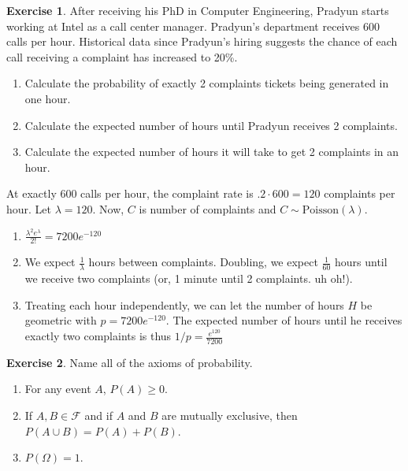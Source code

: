 \documentclass[12pt]{amsart}
\theoremstyle{definition}
\newtheorem{exercise}{Exercise}
\numberwithin{equation}{section}
\theoremstyle{plain}
\newcommand{\Poisson}{\text{Poisson}}
\begin{document}
 

\begin{exercise}
    After receiving his PhD in Computer Engineering, Pradyun starts working at Intel as a call center manager. Pradyun's department receives 600 calls per hour. Historical data since Pradyun's hiring suggests the chance of each call receiving a complaint has increased to 20\%. 
\begin{enumerate}[label=\Alph*.]
    \item Calculate the probability of exactly 2 complaints tickets being generated in one hour. 
    \item Calculate the expected number of hours until Pradyun receives 2 complaints.
    \item Calculate the expected number of hours it will take to get 2 complaints in an hour.
    \end{enumerate}
    \begin{answer}
        At exactly $600$ calls per hour, the complaint rate is $.2\cdot 600 = 120$ complaints per hour. Let $\lambda = 120$. Now, $C$ is number of complaints and $C \sim \Poisson(\lambda)$.
\begin{enumerate}[label=\Alph*.]
            \item $\frac{\lambda^2 e^{\lambda}}{2!} = 7200e^{-120}$
            \item We expect $\frac{1}{\lambda}$ hours between complaints. Doubling, we expect $\frac{1}{60}$ hours until we receive two complaints (or, 1 minute until 2 complaints. uh oh!).
            \item Treating each hour independently, we can let the number of hours $H$ be geometric with $p = 7200e^{-120}$. The expected number of hours until he receives exactly two complaints is thus $1/p = \frac{e^{120}}{7200}$
        \end{enumerate}
    \end{answer}
\end{exercise}

 

\begin{exercise}
Name all of the axioms of probability.
\begin{answer}
\begin{enumerate}[label=\Alph*.]
        \item For any event $A$, $P(A) \geq 0$.
        \item If $A, B \in \mathcal{F}$ and if $A$ and $B$ are mutually exclusive, then $P(A \cup B) = P(A) + P(B)$.
        \item $P(\Omega) = 1$.
    \end{enumerate}
\end{answer}
\end{exercise}
\end{document}
